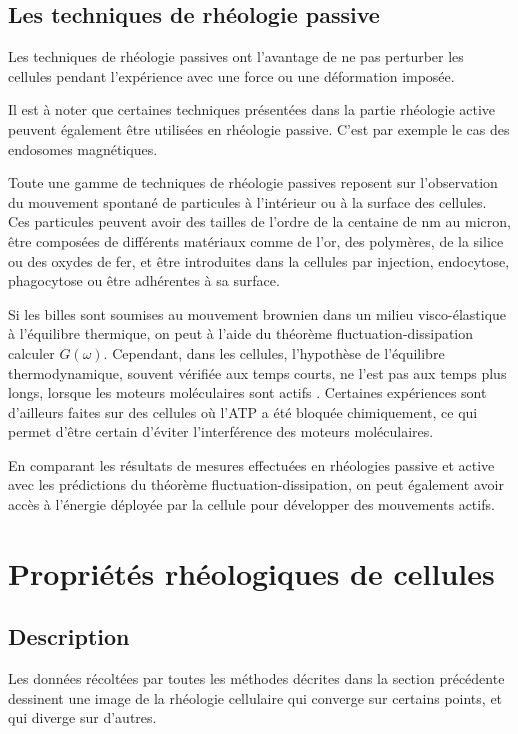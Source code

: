 \documentclass{report}
\begin{document}
\subsection{Les techniques de rhéologie passive}
Les techniques de rhéologie passives ont l'avantage de ne pas perturber les cellules pendant l'expérience avec une force ou une déformation imposée. 

Il est à noter que certaines techniques présentées dans la partie rhéologie active peuvent également être utilisées en rhéologie passive. C'est par exemple le cas des endosomes magnétiques. 

Toute une gamme de techniques de rhéologie passives reposent sur l'observation du mouvement spontané de particules à l'intérieur ou à la surface des cellules. Ces particules peuvent avoir des tailles de l'ordre de la centaine de nm au micron, être composées de différents matériaux comme de l'or, des polymères, de la silice ou des oxydes de fer, et être introduites dans la cellules par injection, endocytose, phagocytose ou être adhérentes à sa surface. 

Si les billes sont soumises au mouvement brownien dans un milieu visco-élastique à l'équilibre thermique, on peut à l'aide du théorème fluctuation-dissipation calculer $G(\omega)$. 
Cependant, dans les cellules, l'hypothèse de l'équilibre thermodynamique, souvent vérifiée aux temps courts, ne l'est pas aux temps plus longs, lorsque les moteurs moléculaires sont actifs \cite{mizuno}. 
Certaines expériences sont d'ailleurs faites sur des cellules où l'ATP a été bloquée chimiquement, ce qui permet d'être certain d'éviter l'interférence des moteurs moléculaires. 

En comparant les résultats de mesures effectuées en rhéologies passive et active avec les prédictions du théorème fluctuation-dissipation, on peut également avoir accès à l'énergie déployée par la cellule pour développer des mouvements actifs. 



\section{Propriétés rhéologiques de cellules}

\subsection{Description}

Les données récoltées par toutes les méthodes décrites dans la section précédente dessinent une image de la rhéologie cellulaire qui converge sur certains points, et qui diverge sur d'autres. 
\end{document}
